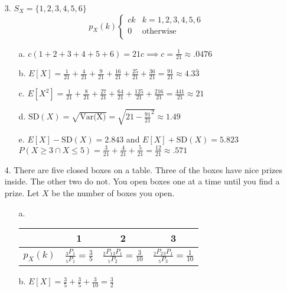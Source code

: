 \documentclass[11pt]{amsart}
\theoremstyle{definition}
\begin{document}
\begin{itemize}
\begin{itemize}
\end{itemize}

\item[3.] $S_X=\{1,2,3,4,5,6\}$
\begin{equation*}
    p_X(k)
    \begin{cases}
        ck &k=1,2,3,4,5,6 \\
        0  &\text{otherwise} \\
    \end{cases}
\end{equation*}
\begin{itemize}
    \item[a.] $c(1+2+3+4+5+6)=21c\implies c=\frac 1{21}\approx .0476$

    \item[b.] $E[X]=\frac 1{21}+\frac 4{21}+\frac 9{21}+\frac{16}{21}+\frac{25}{21}+\frac{36}{21}=\frac{91}{21}\approx 4.3\bar 3$

    \item[c.] $E[X^2]=\frac 1{21}+\frac 8{21}+\frac {27}{21}+\frac{64}{21}+\frac{125}{21}+\frac{216}{21}=\frac{441}{21}\approx 21$

    \item[d.] $\text{SD}(X)=\sqrt{\text{Var(X)}}=\sqrt{21-\frac{91}{21}^2}\approx1.49$

    \item[e.] $E[X]-\text{SD}(X)=2.843$ and $E[X]+\text{SD}(X)=5.823$ \\
              $P(X\ge 3\cap X\le 5)=\frac3{21}+\frac4{21}+\frac5{21}=\frac{12}{21}\approx .571$

\end{itemize}

\item[4.] There are five closed boxes on a table. Three of the boxes have nice prizes inside. The other two do not. You open boxes one at a time until you find a prize. Let $X$ be the number of boxes you open.
\begin{itemize}
    \item[a.]\begin{tabular}{c|c|c|c}
                 & 1 & 2 & 3 \\
        \hline
        $p_X(k)$ & $\frac{_3P_1}{_5P_1}=\frac35$ & $\frac{_2P_1 {_3P_1}}{_5P_2}=\frac{3}{10}$ & $\frac{_2P_2 {_3P_1}}{_5P_3}=\frac{1}{10}$
    \end{tabular}

    \item[b.] $E[X]=\frac 35+\frac 35+\frac 3{10}=\frac 32$


\end{itemize}
\end{itemize}
\end{document}
